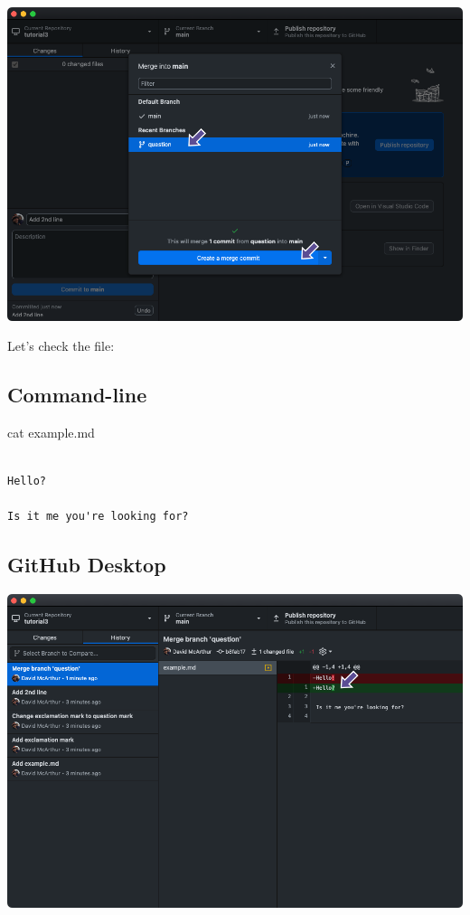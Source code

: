 \documentclass[
  letterpaper,
  DIV=11,
  numbers=noendperiod]{scrartcl}
\newenvironment{Shaded}{\begin{snugshade}}{\end{snugshade}}
\newcommand{\FunctionTok}[1]{\textcolor[rgb]{0.28,0.35,0.67}{#1}}
\newcommand{\NormalTok}[1]{\textcolor[rgb]{0.00,0.23,0.31}{#1}}
\begin{document}
\includegraphics{images/image44.png}

Let's check the file:

\subsection{Command-line}

\begin{Shaded}
\begin{Highlighting}[]
\FunctionTok{cat}\NormalTok{ example.md}
\end{Highlighting}
\end{Shaded}

\begin{verbatim}

Hello?

Is it me you're looking for?
\end{verbatim}

\subsection{GitHub Desktop}

\includegraphics{images/image45.png}
\end{document}
